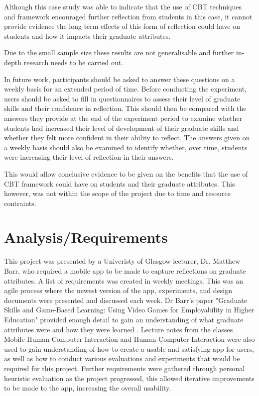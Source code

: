 \documentclass{l4proj}
\begin{document}
Although this case study was able to indicate that the use of CBT techniques and framework encouraged further reflection from students in this case, it cannot provide evidence the long term effects of this form of reflection could have on students and how it impacts their graduate attributes. 

Due to the small sample size these results are not generalisable and further in-depth research needs to be carried out. 

In future work, participants should be asked to answer these questions on a weekly basis for an extended period of time. Before conducting the experiment, users should be asked to fill in questionnaires to assess their level of graduate skills and their confidence in reflection. This should then be compared with the answers they provide at the end of the experiment period to examine whether students had increased their level of development of their graduate skills and whether they felt more confident in their ability to reflect. The answers given on a weekly basis should also be examined to identify whether, over time, students were increasing their level of reflection in their answers. 

This would allow conclusive evidence to be given on the benefits that the use of CBT framework could have on students and their graduate attributes. This however, was not within the scope of the project due to time and resource contraints. 



\chapter{Analysis/Requirements} \label{analysis/reqs}

This project was presented by a Univeristy of Glasgow lecturer, Dr. Matthew Barr, who required a mobile app to be made to capture reflections on graduate attributes. A list of requirements was created in weekly meetings. This was an agile process where the newest version of the app, experiments, and design documents were presented and discussed each week. Dr Barr's paper "Graduate Skills and Game-Based Learning: Using Video Games for Employability in Higher Education" provided enough detail to gain an understanding of what graduate attributes were and how they were learned \citep{barr_2019}. Lecture notes from the classes Mobile Human-Computer Interaction and Human-Computer Interaction were also used to gain understanding of how to create a usable and satisfying app for users, as well as how to conduct various evaluations and experiments that would be required for this project. Further requirements were gathered through personal heuristic evaluation as the project progressed, this allowed iterative improvements to be made to the app, increasing the overall usability.
\end{document}
